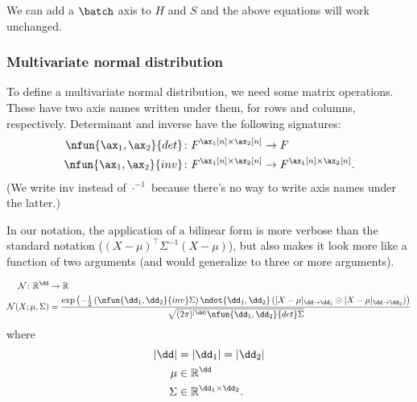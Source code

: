 We can add a $\batch$ axis to $H$ and $S$ and the above equations will work unchanged.

\subsubsection{Multivariate normal distribution}

To define a multivariate normal distribution, we need some matrix operations. These have two axis names written under them, for rows and columns, respectively. Determinant and inverse have the following signatures:
\begin{align*}
\nfun{\ax_1,\ax_2}{det} \colon F^{\ax_1[n] \times \ax_2[n]} &\rightarrow F \\
\nfun{\ax_1,\ax_2}{inv} \colon F^{\ax_1[n] \times \ax_2[n]} &\rightarrow F^{\ax_1[n] \times \ax_2[n]}.
\end{align*}
(We write $\text{inv}$ instead of $\cdot^{-1}$ because there's no way to write axis names under the latter.)

In our notation, the application of a bilinear form is more verbose than the standard notation ($(X-\mu)^\top \Sigma^{-1} (X-\mu)$), but also makes it look more like a function of two arguments (and would generalize to three or more arguments).

\begin{align*}
\mathcal{N} \colon \reals^{\dd} &\rightarrow \reals \\
\mathcal{N}(X; \mu, \Sigma) &= \frac{\exp\left(-\frac{1}{2} \left(\nfun{\dd_1, \dd_2}{inv} \Sigma\right) \ndot{\dd_1,\dd_2} \left([X - \mu]_{\dd\rightarrow\dd_1} \odot [X - \mu]_{\dd\rightarrow\dd_2} \right) \right)}{\sqrt{(2 \pi)^{|\dd|} \nfun{\dd_1, \dd_2}{det} \Sigma}}
\end{align*}
where
\begin{align*}
|\dd| &= |\dd_1| = |\dd_2| \\
\mu &\in \reals^{\dd} \\
\Sigma & \in \reals^{\dd_1 \times \dd_2}.
\end{align*}
\fi
